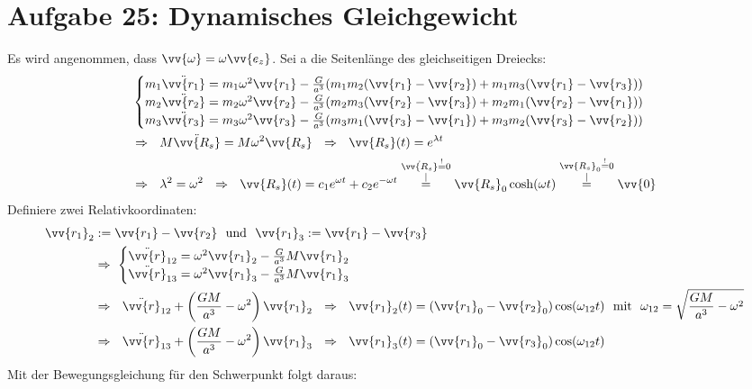 \documentclass[a4paper,12pt]{article}
\begin{document}
\section*{Aufgabe 25: Dynamisches Gleichgewicht}
Es wird angenommen, dass $\vv{\omega}=\omega \vv{e_z}$. Sei a die Seitenlänge des gleichseitigen Dreiecks:
\begin{align*}
&\begin{cases} m_1\ddot{\vv{r_1}}=m_1\omega^2\vv{r_1}-\frac{G}{a^3}(m_1m_2(\vv{r_1}-\vv{r_2})+m_1m_3(\vv{r_1}-\vv{r_3}))\\  m_2\ddot{\vv{r_2}}=m_2\omega^2\vv{r_2}-\frac{G}{a^3}(m_2m_3(\vv{r_2}-\vv{r_3})+m_2m_1(\vv{r_2}-\vv{r_1})) \\ m_3\ddot{\vv{r_3}}=m_3\omega^2\vv{r_3}-\frac{G}{a^3}(m_3m_1(\vv{r_3}-\vv{r_1})+m_3m_2(\vv{r_3}-\vv{r_2})) \end{cases}\\
&\Rightarrow\ \ M\ddot{\vv{R_s}}=M\omega^2\vv{R_s}\ \ \Rightarrow\ \ \vv{R_s}(t) = e^{\lambda t}\\
&\Rightarrow\ \ \lambda^2 = \omega^2\ \ \Rightarrow\ \ \vv{R_s}(t) = c_1e^{\omega t}+c_2e^{-\omega t}\overset{\substack{\dot{\vv{R_s}}\overset{!}{=}0\\|}}{=}\vv{R_s}_0\cosh(\omega t)\overset{\substack{\vv{R_s}_0\overset{!}{=}0\\|}}{=}\vv{0}
\end{align*}
Definiere zwei Relativkoordinaten:
\begin{align*}
\vv{r_1}_2&:=\vv{r_1}-\vv{r_2}\ \ \mathrm{und}\ \ \vv{r_1}_3:=\vv{r_1}-\vv{r_3}\\
&\Rightarrow\ \begin{cases} \ddot{\vv{r}}_{12}=\omega^2\vv{r_1}_2 -\frac{G}{a^3}M\vv{r_1}_2 \\ \ddot{\vv{r}}_{13}=\omega^2\vv{r_1}_3 -\frac{G}{a^3}M\vv{r_1}_3 \end{cases}\\
&\Rightarrow\ \ \ddot{\vv{r}}_{12}+\left(\frac{GM}{a^3}-\omega^2\right)\vv{r_1}_2\ \ \Rightarrow\ \ \vv{r_1}_2(t)=(\vv{r_1}_0-\vv{r_2}_0)\cos(\omega_{12}t)\ \ \mathrm{mit}\ \ \omega_{12}=
\sqrt{\frac{GM}{a^3}-\omega^2}\\
&\Rightarrow\ \ \ddot{\vv{r}}_{13}+\left(\frac{GM}{a^3}-\omega^2\right)\vv{r_1}_3\ \ \Rightarrow\ \ \vv{r_1}_3(t)=(\vv{r_1}_0-\vv{r_3}_0)\cos(\omega_{12}t)
\end{align*}
Mit der Bewegungsgleichung für den Schwerpunkt folgt daraus:
\end{document}
